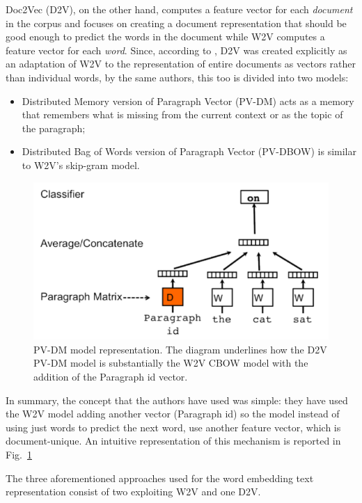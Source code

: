 \documentclass[10pt]{article}
\begin{document}
Doc2Vec (D2V), on the other hand, computes a feature vector for each \textit{document} in the corpus and focuses on creating a document representation that should be good enough to predict the words in the document while W2V computes a feature vector for each \textit{word}.
Since, according to \cite{doc2vec}, D2V was created explicitly as an adaptation of W2V to the representation of entire documents as vectors rather than individual words, by the same authors, this too is divided into two models:
\begin{itemize}
\item Distributed Memory version of Paragraph Vector (PV-DM) acts as a memory that remembers what is missing from the current context or as the topic of the paragraph;
\item Distributed Bag of Words version of Paragraph Vector (PV-DBOW) is similar to W2V's skip-gram model.
\end{itemize}
\begin{figure}
\centering
\includegraphics[scale=0.7]{figs/PV-DM.png}
\caption{PV-DM model representation. The diagram underlines how the D2V PV-DM model is substantially the W2V CBOW model with the addition of the Paragraph id vector.}
\label{fig:pvdm_model}
\end{figure}
In summary, the concept that the authors have used was simple: they have used the W2V model adding another vector (Paragraph id) so the model instead of using just words to predict the next word, use another feature vector, which is document-unique. An intuitive representation of this mechanism is reported in Fig.~\ref{fig:pvdm_model}

The three aforementioned approaches used for the word embedding text representation consist of two exploiting W2V and one D2V.
\end{document}
